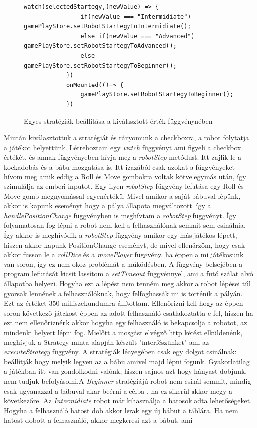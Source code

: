 \documentclass[a4paper,twoside]{article}
\begin{document}
\begin{figure}
	\caption{Egyes stratégiák beállítása a kiválasztott érték függvénynében}
	\begin{minipage}{\textwidth}
		\begin{lstlisting}[style=javascriptStyle]
			watch(selectedStartegy,(newValue) => {
				if(newValue === "Intermidiate") gamePlayStore.setRobotStartegyToIntermidiate();
				else if(newValue === "Advanced") gamePlayStore.setRobotStartegyToAdvanced();
				else gamePlayStore.setRobotStartegyToBeginner();
			})
			onMounted(()=> {
				gamePlayStore.setRobotStartegyToBeginner();
			})
		\end{lstlisting}
	\end{minipage}
	
	\label{setStrat}
\end{figure}
\FloatBarrier
Miután kiválasztottuk a stratégiát és rányomunk a checkboxra, a robot folytatja a játékot helyettünk. Létrehoztam egy \textit{watch} függvényt ami figyeli a checkbox értékét, és annak függvényeben hívja meg a \textit{robotStep} metódust. Itt zajlik le a kockadobás és a bábu mozgatása is. Itt igazából csak azokat a függvényeket hívom meg amik eddig a Roll és Move gombokra voltak kötve egymás után, így szimulálja az emberi inputot. Egy ilyen \textit{robotStep} függvény lefutása egy Roll és Move gomb megnyomással egyenértékű. Mivel amikor a saját bábuval lépünk, akkor is kapunk eseményt hogy a pálya állapota megváltozott, így a \textit{handlePositionChange} függvényben is meghívtam a \textit{robotStep} függvényt. Így folyamatosan fog lépni a robot nem kell a felhasználónak semmit sem csinálnia. Így akkor is meghívódik a \textit{robotStep} függvény amikor egy más játékos lépett, hiszen akkor kapunk PositionChange eseményt, de mivel ellenőrzöm, hogy csak akkor fusson le a \textit{rollDice} és a \textit{movePlayer} függvény, ha éppen a mi játékosunk van soron, így ez nem okoz problémát a működésben. A függvény belsejében a program lefutását kicsit lassítom a \textit{setTimeout} függvénnyel, ami a futó szálat alvó állapotba helyezi. Hogyha ezt a lépést nem tenném meg akkor a robot lépései túl gyorsak lennének a felhasználóknak, hogy felfoghassák mi is történik a pályán. Ezt az értéket 350  milliszekundumra állítottam. Ellenőrizni kell hogy az éppen soron következő játékost éppen az adott felhasználó csatlakoztatta-e fel, hiszen ha ezt nem ellenőriznénk akkor hogyha egy felhasználó is bekapcsolja a robotot, az mindenki helyett lépni fog. Mielőtt a mozgást elvégző http kérést elküldenénk, meghívjuk a Strategy minta alapján készült "interfészünket" ami az \textit{executeStrategy} függvény. A stratégiák lényegében csak egy dolgot csinálnak: beállítják hogy melyik legyen az a bábu amivel majd lépni fogunk. Gyakorlatilag a játékban itt van gondolkodni valónk, hiszen sajnos azt hogy hányast dobjunk, nem tudjuk befolyásolni.A \textit{Beginner} stratégiájú robot nem csinál semmit, mindig csak ugyanazzal a bábuval akar beérni a célba , ha ez sikerül akkor megy a következőre. Az \textit{Intermidiate} robot már kihasználja a hatosok adta lehetőségeket. Hogyha a felhasználó hatost dob akkor lerak egy új bábut a táblára. Ha nem hatost dobott a felhasználó, akkor megkeresi azt a bábut, ami 
\end{document}
